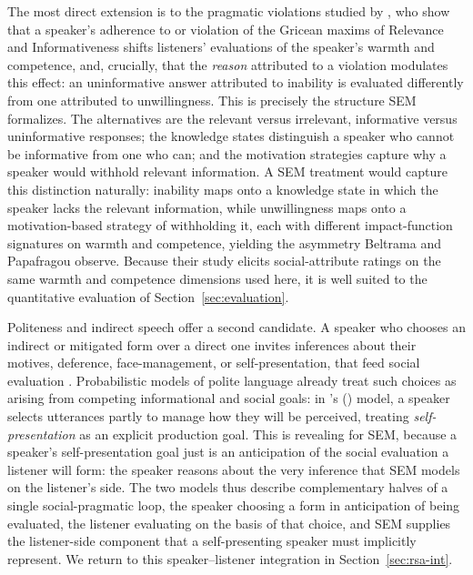 \documentclass[12pt,a4paper]{article}
\begin{document}
The most direct extension is to the pragmatic violations studied by
\citet{beltramapapafragou2023}, who show that a speaker's adherence to or
violation of the Gricean maxims of Relevance and Informativeness shifts listeners'
evaluations of the speaker's warmth and competence, and, crucially, that the
\emph{reason} attributed to a violation modulates this effect: an uninformative
answer attributed to inability is evaluated differently from one attributed to
unwillingness. This is precisely the structure SEM formalizes. The alternatives
are the relevant versus irrelevant, informative versus uninformative responses;
the knowledge states distinguish a speaker who cannot be informative from one who
can; and the motivation strategies capture why a speaker would withhold relevant
information. A SEM treatment would capture this distinction naturally: inability maps onto
a knowledge state in which the speaker lacks the relevant information, while
unwillingness maps onto a motivation-based strategy of withholding it, each
with different impact-function signatures on warmth and competence, yielding
the asymmetry Beltrama and Papafragou observe.
Because their study elicits social-attribute ratings on the same warmth and
competence dimensions used here, it is well suited to the quantitative evaluation
of Section~\ref{sec:evaluation}.

Politeness and indirect speech offer a second candidate. A speaker who chooses an
indirect or mitigated form over a direct one invites inferences about their
motives, deference, face-management, or self-presentation, that feed social
evaluation \citep{brownlevinson1987,LeePinker2010}. Probabilistic models of
polite language already treat such choices as arising from competing
informational and social goals: in \citeauthor{yoontessleretal2020}'s
(\citeyear{yoontessleretal2020}) model, a speaker selects utterances partly to
manage how they will be perceived, treating \emph{self-presentation} as an
explicit production goal. This is revealing for SEM, because a speaker's
self-presentation goal just is an anticipation of the social evaluation a
listener will form: the speaker reasons about the very inference that SEM models
on the listener's side. The two models thus describe complementary halves of a
single social-pragmatic loop, the speaker choosing a form in anticipation of
being evaluated, the listener evaluating on the basis of that choice, and SEM
supplies the listener-side component that a self-presenting speaker must
implicitly represent. We return to this speaker--listener integration in
Section~\ref{sec:rsa-int}.
\end{document}
